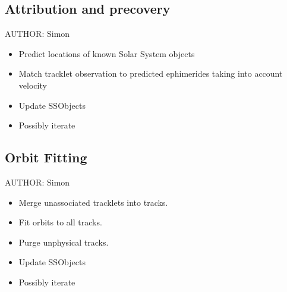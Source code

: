 \subsection{Attribution and precovery}
\label{sec:acAttributionAndPrecovery}
AUTHOR: Simon
\begin{itemize}
\item Predict locations of known Solar System objects
\item Match tracklet observation to predicted ephimerides taking into account velocity
\item Update SSObjects
\item Possibly iterate
\end{itemize}

\subsection{Orbit Fitting}
\label{sec:acOrbitFitting}
AUTHOR: Simon
\begin{itemize}
\item Merge unassociated tracklets into tracks.
\item Fit orbits to all tracks.
\item Purge unphysical tracks.
\item Update SSObjects
\item Possibly iterate
\end{itemize}
